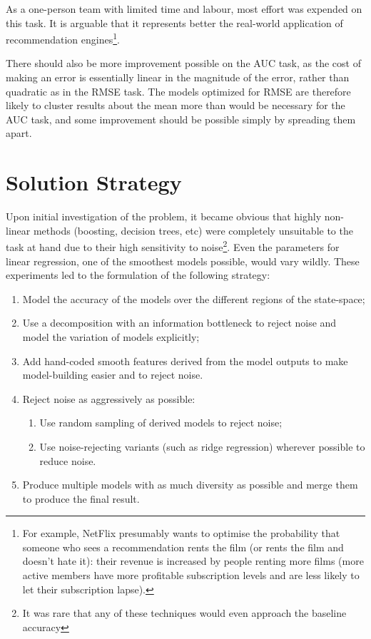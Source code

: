 \documentclass{article}
\begin{document}
As a one-person team with limited time and labour, most effort was expended on this task.  It is arguable that it represents better the real-world application of recommendation engines\footnote{For example, NetFlix presumably wants to optimise the probability that someone who sees a recommendation rents the film (or rents the film and doesn't hate it): their revenue is increased by people renting more films (more active members have more profitable subscription levels and are less likely to let their subscription lapse).}.

There should also be more improvement possible on the AUC task, as the cost of making an error is essentially linear in the magnitude of the error, rather than quadratic as in the RMSE task.  The models optimized for RMSE are therefore likely to cluster results about the mean more than would be necessary for the AUC task, and some improvement should be possible simply by spreading them apart.

\section{Solution Strategy}

Upon initial investigation of the problem, it became obvious that highly non-linear methods (boosting, decision trees, etc) were completely unsuitable to the task at hand due to their high sensitivity to noise\footnote{It was rare that any of these techniques would even approach the baseline accuracy}.  Even the parameters for linear regression, one of the smoothest models possible, would vary wildly.  These experiments led to the formulation of the following strategy:

\begin{enumerate}
\item Model the accuracy of the models over the different regions of the state-space;
\item Use a decomposition with an information bottleneck to reject noise and model the variation of models explicitly;
\item Add hand-coded smooth features derived from the model outputs to make model-building easier and to reject noise.
\item Reject noise as aggressively as possible:
  \begin{enumerate}
  \item Use random sampling of derived models to reject noise;
  \item Use noise-rejecting variants (such as ridge regression) wherever possible to reduce noise.
    \end{enumerate}
\item Produce multiple models with as much diversity as possible and merge them to produce the final result.
\end{enumerate}
\end{document}
